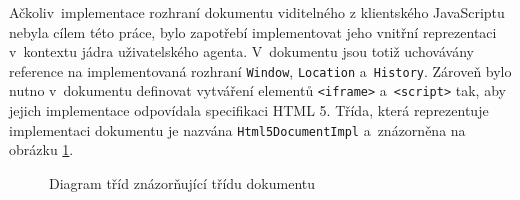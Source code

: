 Ačkoliv~implementace rozhraní dokumentu viditelného z klientského JavaScriptu nebyla cílem této práce, bylo zapotřebí implementovat jeho vnitřní reprezentaci v~kontextu jádra uživatelského agenta. V~dokumentu jsou totiž uchovávány reference na implementovaná rozhraní \texttt{Window}, \texttt{Location} a~\texttt{History}. Zároveň bylo nutno v~dokumentu definovat vytváření elementů \texttt{<iframe>} a~\texttt{<script>} tak, aby jejich implementace odpovídala specifikaci HTML 5. Třída, která reprezentuje implementaci dokumentu je nazvána \texttt{Html5DocumentImpl} a~znázorněna na obrázku \ref{Figure.DocumentImpl}. 

\begin{figure}[H]
  \begin{center}
    \caption{Diagram tříd znázorňující třídu dokumentu}
    \label{Figure.DocumentImpl}
  \end{center}
\end{figure}

